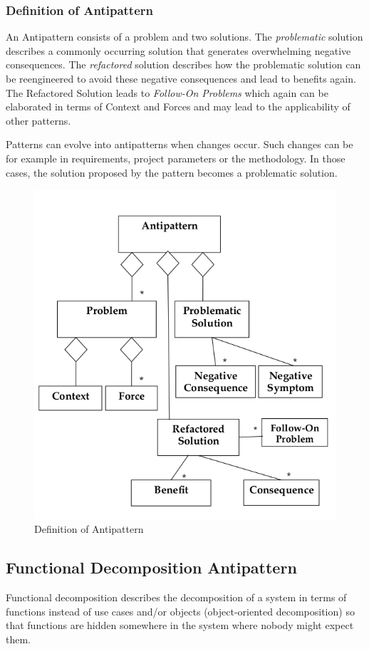 \subsubsection*{Definition of Antipattern}
An Antipattern consists of a problem and two solutions.
The \textit{problematic} solution describes a commonly occurring solution that generates overwhelming negative consequences.
The \textit{refactored} solution describes how the problematic solution can be reengineered to avoid these negative consequences and lead to benefits again. 
The Refactored Solution leads to \textit{Follow-On Problems} which again can be elaborated in terms of Context and Forces and may lead to the applicability of other patterns.\newline

Patterns can evolve into antipatterns when changes occur.
Such changes can be for example in requirements, project parameters or the methodology.
In those cases, the solution proposed by the pattern becomes a problematic solution.
\newpage

\begin{figure}[h]
	\centering
	\includegraphics[width=0.7\linewidth]{images/antipattern}
	\caption{Definition of Antipattern}
\end{figure}

\newpage

\subsection{Functional Decomposition Antipattern}
Functional decomposition describes the decomposition of a system in terms of functions instead of use cases and/or objects (object-oriented decomposition) so that functions are hidden somewhere in the system where nobody might expect them.

